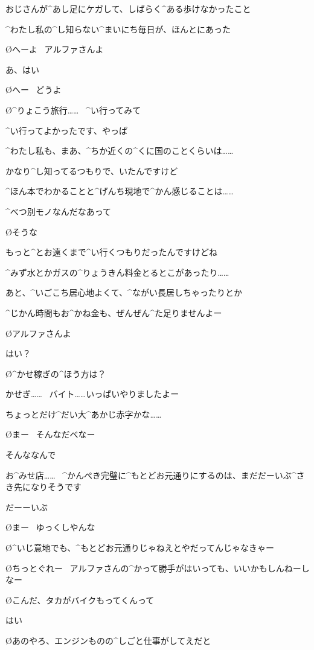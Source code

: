 \A おじさんが^{あし}{足}にケガして、しばらく^{ある}{歩}けなかったこと

\A ^{わたし}{私}の^{し}{知}らない^{まいにち}{毎日}が、ほんとにあった

\page
\O へーよ
\ アルファさんよ

\A あ、はい

\O へー
\ どうよ

\O ^{りょこう}{旅行}……
\ ^{い}{行}ってみて

\A ^{い}{行}ってよかったです、やっぱ

\A ^{わたし}{私}も、まあ、^{ちか}{近}くの^{くに}{国}のことくらいは……

\A かなり^{し}{知}ってるつもりで、いたんですけど

\page
\A ^{ほん}{本}でわかることと^{げんち}{現地}で^{かん}{感}じることは……

\A ^{べつ}{別}モノなんだなあって

\O そうな

\page
\A もっと^{とお}{遠}くまで^{い}{行}くつもりだったんですけどね

\A ^{みず}{水}とかガスの^{りょうきん}{料金}とるとこがあったり……

\A あと、^{いごこち}{居心地}よくて、^{ながい}{長居}しちゃったりとか

\A ^{じかん}{時間}もお^{かね}{金}も、ぜんぜん^{た}{足}りませんよー

\page
\O アルファさんよ

\A はい？

\O ^{かせ}{稼}ぎの^{ほう}{方}は？

\A かせぎ……
\ バイト……いっぱいやりましたよー

\A ちょっとだけ^{だい}{大}^{あかじ}{赤字}かな……

\O まー
\ そんなだべなー

\page
\A そんななんで

\A お^{みせ}{店}……
\ ^{かんぺき}{完璧}に^{もとどお}{元通}りにするのは、まだだーいぶ^{さき}{先}になりそうです

\A だーーいぶ

\O まー
\ ゆっくしやんな

\O ^{いじ}{意地}でも、^{もとどお}{元通}りじゃねえとやだってんじゃなきゃー

\O ちっとぐれー
\ アルファさんの^{かって}{勝手}がはいっても、いいかもしんねーしなー

\page
\O こんだ、タカがバイクもってくんって

\A はい

\O あのやろ、エンジンものの^{しごと}{仕事}がしてえだと


